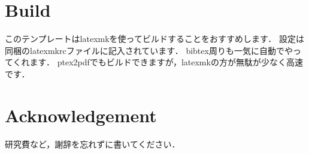 \documentclass[a4j,10pt,english]{jsarticle}
\begin{document}
\section{Build}
このテンプレートはlatexmkを使ってビルドすることをおすすめします．
設定は同梱のlatexmkrcファイルに記入されています．
bibtex周りも一気に自動でやってくれます．
ptex2pdfでもビルドできますが，latexmkの方が無駄が少なく高速です．

\section*{Acknowledgement}
研究費など，謝辞を忘れずに書いてください．

\small
\normalsize
\end{document}

